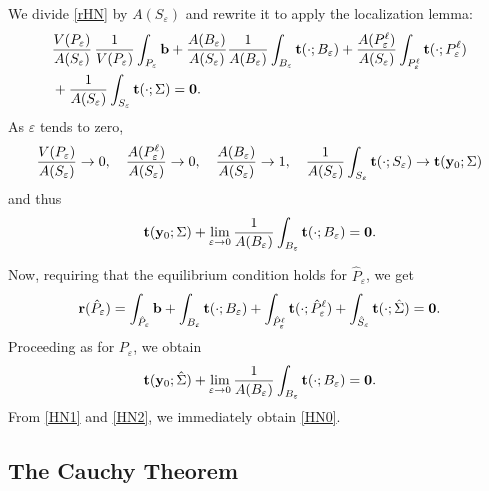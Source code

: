 We divide \eqref{rHN} by $A(S_\varepsilon)$ and rewrite it to apply the localization lemma:
\begin{equation}
	\begin{aligned}
		&\frac{V(P_\varepsilon)}{A(S_\varepsilon)} \, \frac{1}{V(P_\varepsilon)} \int_{P_\varepsilon} \mathbf{b} +
		\frac{A(B_\varepsilon)}{A(S_\varepsilon)} \frac{1}{A(B_\varepsilon)} \int_{B_\varepsilon} \mathbf{t}(\cdot; B_\varepsilon) + \frac{A(P^\ell_\varepsilon)}{A(S_\varepsilon)} \int_{P^\ell_\varepsilon} \mathbf{t}(\cdot; P^\ell_\varepsilon) \\
		& + \frac{1}{A(S_\varepsilon)} \int_{S_\varepsilon} \mathbf{t}(\cdot; \Sigma) = \mathbf{0}.
	\end{aligned}
\end{equation}
As $\varepsilon$ tends to zero,
\begin{equation}
	\frac{V(P_\varepsilon)}{A(S_\varepsilon)} \to 0, \quad \frac{A(P^\ell_\varepsilon)}{A(S_\varepsilon)} \to 0, \quad \frac{A(B_\varepsilon)}{A(S_\varepsilon)} \to 1, \quad \frac{1}{A(S_\varepsilon)} \int_{S_\varepsilon} \mathbf{t}(\cdot; S_\varepsilon) \to \mathbf{t}(\mathbf{y}_0; \Sigma)
\end{equation}
and thus
\begin{equation}\label{HN1}
	\mathbf{t}(\mathbf{y}_0; \Sigma) + \lim_{\varepsilon \to 0} \frac{1}{A(B_\varepsilon)} \int_{B_\varepsilon} \mathbf{t}(\cdot; B_\varepsilon) = \mathbf{0}.
\end{equation}

Now, requiring that the equilibrium condition holds for $\hat P_\varepsilon$, we get
\begin{equation}
	\mathbf{r}(\hat P_\varepsilon) = \int_{\hat P_\varepsilon} \mathbf{b} + \int_{B_\varepsilon} \mathbf{t}(\cdot; B_\varepsilon) + \int_{\hat P^\ell_\varepsilon} \mathbf{t}(\cdot; \hat P^\ell_\varepsilon) + \int_{\hat S_\varepsilon} \mathbf{t}(\cdot; \hat{\Sigma}) = \mathbf{0}.
\end{equation}
Proceeding as for $P_\varepsilon$, we obtain
\begin{equation}\label{HN2}
	\mathbf{t}(\mathbf{y}_0; \hat\Sigma) + \lim_{\varepsilon \to 0} \frac{1}{A(B_\varepsilon)} \int_{B_\varepsilon} \mathbf{t}(\cdot; B_\varepsilon) = \mathbf{0}.
\end{equation}
From \eqref{HN1} and \eqref{HN2}, we immediately obtain \eqref{HN0}.



\subsection{The Cauchy Theorem}

